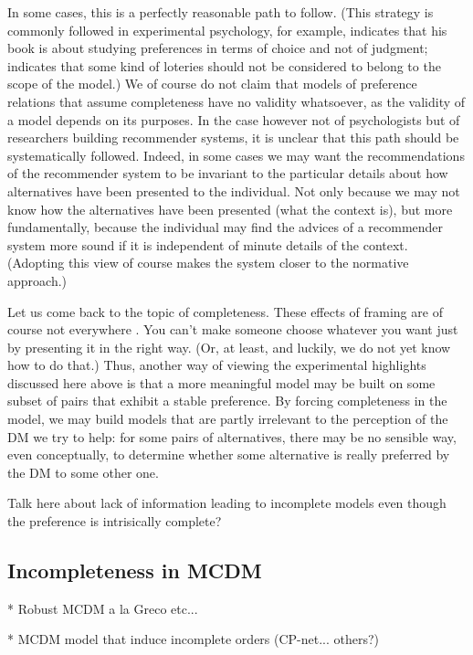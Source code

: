 \documentclass[french, english]{llncs}
\begin{document}
	In some cases, this is a perfectly reasonable path to follow. (This strategy is commonly followed in experimental psychology, for example, \citet{Luce} indicates that his book is about studying preferences in terms of choice and not of judgment; \citet{MacCrimmon} indicates that some kind of loteries should not be considered to belong to the scope of the model.) We of course do not claim that models of preference relations that assume completeness have no validity whatsoever, as the validity of a model depends on its purposes. In the case however not of psychologists but of researchers building recommender systems, it is unclear that this path should be systematically followed. Indeed, in some cases we may want the recommendations of the recommender system to be invariant to the particular details about how alternatives have been presented to the individual. Not only because we may not know how the alternatives have been presented (what the context is), but more fundamentally, because the individual may find the advices of a recommender system more sound if it is independent of minute details of the context. (Adopting this view of course makes the system closer to the normative approach.)
	
	Let us come back to the topic of completeness. These effects of framing are of course not everywhere \citep{slovic}. You can’t make someone choose whatever you want just by presenting it in the right way. (Or, at least, and luckily, we do not yet know how to do that.) Thus, another way of viewing the experimental highlights discussed here above is that a more meaningful model may be built on some subset of pairs that exhibit a stable preference. By forcing completeness in the model, we may build models that are partly irrelevant to the perception of the \ac{DM} we try to help: for some pairs of alternatives, there may be no sensible way, even conceptually, to determine whether some alternative is really preferred by the \ac{DM} to some other one.
	
	Talk here about lack of information leading to incomplete models even though the preference is intrisically complete?
	
	\subsection{Incompleteness in MCDM}
	
	* Robust MCDM a la Greco etc...
	
	* MCDM model that induce incomplete orders (CP-net... others?)
	
\end{document}

